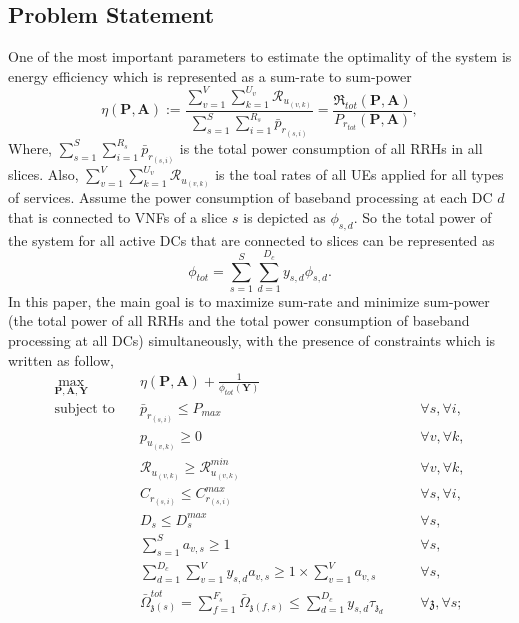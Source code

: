 \documentclass[conference]{IEEEtran}
\begin{document}
\subsection{Problem Statement}
One of the most important parameters to estimate the optimality of the system is energy efficiency which is represented as a sum-rate to sum-power 
\begin{equation}
\eta(\boldsymbol{P},\boldsymbol{A}) := \frac{\sum\limits_{v=1}^{V} \sum\limits_{k=1}^{{U}_v}\mathcal{R}_{u_{(v,k)}} }{\sum\limits_{s=1}^{S} \sum\limits_{i=1}^{{R}_s}\bar{p}_{r_{(s,i)}}} = \frac{\mathfrak{R}_{tot}(\boldsymbol{P},\boldsymbol{A})}{P_{r_{tot}}(\boldsymbol{P},\boldsymbol{A})},
\end{equation}
Where, $\sum\limits_{s=1}^{S}\sum\limits_{i=1}^{{R}_s}\bar{p}_{r_{(s,i)}}$ is the total power consumption of all RRHs in all slices. Also, $\sum\limits_{v=1}^{V} \sum\limits_{k=1}^{{U}_v}\mathcal{R}_{u_{(v,k)}} $ is the toal rates of all UEs applied for all types of services. 
Assume the power consumption of baseband processing at each DC $d$ that is connected to VNFs of a slice $s$ is depicted as
$\phi_{s,d}$. So the total power of the system for all active DCs that are connected to slices can be represented as  
\begin{equation*}
\phi_{tot} = \sum_{s=1}^{S}\sum_{d=1}^{D_c}y_{s,d}\phi_{s,d}.
\end{equation*} 
In this paper, the main goal is to maximize sum-rate and minimize sum-power (the total power of all RRHs and the total power consumption of baseband processing at all DCs) simultaneously, with the presence of constraints which is written as follow, 
\begin{subequations}
\begin{alignat}{4}
\max\limits_{\boldsymbol{P}, \boldsymbol{A}, \boldsymbol{Y} }   \quad &   \eta(\boldsymbol{P},\boldsymbol{A})+\frac{1}{\phi_{tot}(\boldsymbol{Y})} \\
\text{subject to} \quad  & \bar{p}_{r_{(s,i)}} \leq P_{max} && \quad \forall s, \forall i, 
 \label{c11} \\
&p_{u_{(v,k)}}  \geq 0  &&\quad \forall v, \forall k,\label{c12} \\
&\mathcal{R}_{u_{(v,k)}} \geq  \mathcal{R}_{u_{(v,k)}}^{min} && \quad \forall v, \forall k,\label{c13} \\                                 
&C_{r_{(s,i)}} \leq C_{r_{(s,i)}}^{max}  &&\quad \forall s, \forall i, \label{c14}\\
&D_{s} \leq D_{s}^{max}  &&\quad \forall s,\label{c15} \\
& \sum_{s=1}^{S}a_{v,s} \geq 1 &&\quad \forall s, \label{c21} \\
& \sum_{d=1}^{D_c}\sum_{v=1}^{V}y_{s,d}a_{v,s} \geq 1\times\sum_{v=1}^{V}a_{v,s} &&\quad \forall s,\label{c23} \\
& \bar{\Omega}_{\mathfrak{z}(s)}^{tot} = \sum_{f=1}^{F_s}\bar{\Omega}_{\mathfrak{z}(f,s)} \leq  \sum_{d=1}^{D_c} y_{s,d} \tau_{\mathfrak{z}_d}                      
 && \quad \forall \mathfrak{z}, \forall s; \label{c22}
\end{alignat}
\label{constraints}
\end{subequations}
\end{document}
